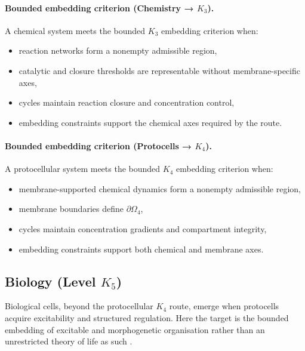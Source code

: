 \paragraph{Bounded embedding criterion (Chemistry → \texorpdfstring{\(K_3\)}{K3}).}
A chemical system meets the bounded \(K_3\) embedding criterion when:
\begin{itemize}
  \item reaction networks form a nonempty admissible region,
  \item catalytic and closure thresholds are representable without
        membrane-specific axes,
  \item cycles maintain reaction closure and concentration control,
  \item embedding constraints support the chemical axes required by the
        route.
\end{itemize}

\paragraph{Bounded embedding criterion (Protocells → \texorpdfstring{\(K_4\)}{K4}).}
A protocellular system meets the bounded \(K_4\) embedding criterion when:
\begin{itemize}
  \item membrane-supported chemical dynamics form a nonempty admissible
        region,
  \item membrane boundaries define \(\partial\Omega_4\),
  \item cycles maintain concentration gradients and compartment integrity,
  \item embedding constraints support both chemical and membrane axes.
\end{itemize}

\subsection{Biology (Level \texorpdfstring{$K_5$}{K5})}

Biological cells, beyond the protocellular \(K_4\) route, emerge when
protocells acquire excitability and structured regulation.
Here the target is the bounded embedding of excitable and morphogenetic organisation rather
than an unrestricted theory of life as such \parencite{turing_morphogenesis,hopfield_nn}.

